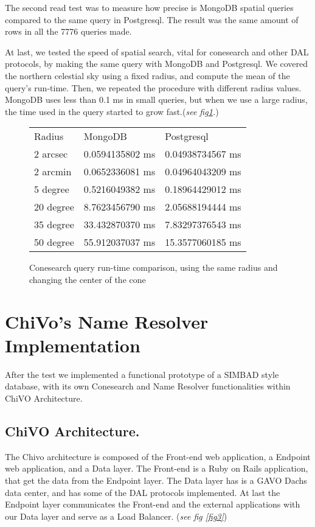 \documentclass[11pt,twoside]{article}
\begin{document}
    The second read test was to measure how precise is MongoDB spatial queries
    compared to the same query in Postgresql.
    The result was the same amount of rows in all the 7776 queries made.
                
    At last, we tested the speed of spatial search, vital for conesearch and
    other DAL protocols, by making the same query with MongoDB 
    and Postgresql. We covered the northern celestial sky using a fixed radius,
    and compute the mean of the query's run-time. Then, we repeated the
    procedure with different radius values. MongoDB uses less than 0.1 ms in small queries, 
    but when we use a large radius, the time used
    in the query started to grow fast.(\emph{see fig\ref{fig:cone}.})
\begin{figure}
\centering

\begin{tabular}{lll}
 Radius &MongoDB &Postgresql\\
2 arcsec&   0.0594135802 ms &0.04938734567 ms\\
2 arcmin&   0.0652336081 ms &0.04964043209 ms\\
5 degree&   0.5216049382 ms& 0.18964429012 ms\\ 
20 degree & 8.7623456790 ms& 2.05688194444 ms\\
35 degree & 33.432870370 ms& 7.83297376543 ms\\
50 degree & 55.912037037 ms& 15.3577060185 ms
\end{tabular}


\caption{Conesearch query run-time comparison, using the same radius and changing the center of the cone}
\label{fig:cone}
\end{figure}    

\section{ChiVo's Name Resolver Implementation}

  After the test we implemented a functional prototype of a SIMBAD style database, with its own Conesearch and Name Resolver functionalities
within ChiVO Architecture.

\subsection{ChiVO Architecture.}  The Chivo architecture is composed of the Front-end web application, a Endpoint web application,
and a Data layer.  The Front-end is a Ruby on Rails application, that get the data from the Endpoint layer. 
The Data layer has is a GAVO Dachs data center, and has some of the DAL protocols implemented.
At last the Endpoint layer communicates the Front-end and the external applications with our Data layer and serve as a Load Balancer. (\emph{see fig \ref{fig3}})
\end{document}
